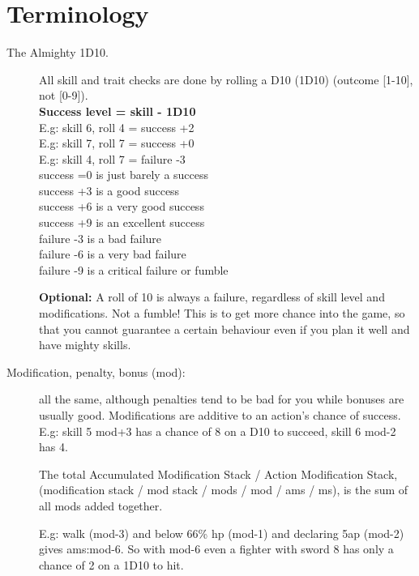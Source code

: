 
\section*{Terminology}


\begin{description}


\item[The Almighty 1D10.] 
All skill and trait checks are done by rolling a D10 (1D10) (outcome [1-10], not [0-9]).\\
\textbf{Success level = skill - 1D10} \\
E.g: skill 6, roll 4 = success +2 \\
E.g: skill 7, roll 7 = success +0 \\
E.g: skill 4, roll 7 = failure -3 \\
success =0 is just barely a success \\
success +3 is a good success \\
success +6 is a very good success \\
success +9 is an excellent success \\
failure -3 is a bad failure \\
failure -6 is a very bad failure \\
failure -9 is a critical failure or fumble

\textbf{Optional:} A roll of 10 is always a failure, regardless of skill level and modifications. Not a fumble! This is to get more chance into the game, so that you cannot guarantee a certain behaviour even if you plan it well and have mighty skills.


\item[Modification, penalty, bonus (mod):] 
all the same, although penalties tend to be bad for you while bonuses are usually good. Modifications are additive to an action's chance of success. \\
E.g: skill 5 mod+3 has a chance of 8 on a D10 to succeed, skill 6 mod-2 has 4.

The total Accumulated Modification Stack / Action Modification Stack, (modification stack / mod stack / mods / mod / ams / ms), is the sum of all mods added together.

E.g: walk (mod-3) and below 66\% hp (mod-1) and declaring 5ap (mod-2) gives ams:mod-6. So with mod-6 even a fighter with sword 8 has only a chance of 2 on a 1D10 to hit.



\end{description}
